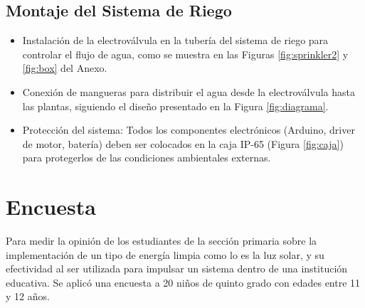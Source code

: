 \documentclass[12pt]{article}
\begin{document}
\subsection{Montaje del Sistema de Riego}
\begin{itemize}
      \item Instalación de la electroválvula en la tubería del sistema de riego para controlar el flujo de agua, como se muestra en las Figuras \ref{fig:sprinkler2} y \ref{fig:box} del Anexo.

      \item Conexión de mangueras para distribuir el agua desde la electroválvula hasta las plantas, siguiendo el diseño presentado en la Figura \ref{fig:diagrama}.

      \item Protección del sistema: Todos los componentes electrónicos (Arduino, driver de motor, batería) deben ser colocados en la caja IP-65 (Figura \ref{fig:caja}) para protegerlos de las condiciones ambientales externas.
\end{itemize}
\newpage
\section{Encuesta}
Para medir la opinión de los estudiantes de la sección primaria sobre la implementación de un tipo de energía limpia como lo es la luz solar, y su efectividad al ser utilizada para impulsar un sistema dentro de una institución educativa. Se aplicó una encuesta a 20 niños de quinto grado con edades entre 11 y 12 años.
\end{document}
